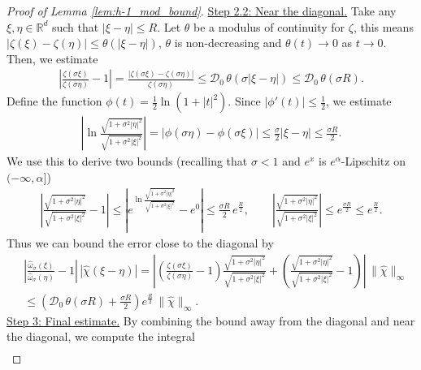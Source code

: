 \documentclass[reqno, 11pt]{amsart}
\numberwithin{equation}{section}
\theoremstyle{definition}
\begin{document}
\begin{proof}[Proof of Lemma \ref{lem:h-1_mod_bound}]
    \underline{Step 2.2: Near the diagonal.} Take any $\xi,\eta\in\mathbb{R}^{d}$ such that $|\xi-\eta|\leq R$. Let $\theta$ be a modulus of continuity for $\zeta$, this means $|\zeta(\xi)-\zeta(\eta)|\leq\theta(|\xi-\eta|)$, $\theta$ is non-decreasing and $\theta(t)\rightarrow 0$ as $t\rightarrow 0$. Then, we estimate
    \begin{align*}
        \left|\frac{\zeta(\sigma \xi)}{\zeta(\sigma \eta)}-1\right|
        =\frac{|\zeta(\sigma \xi)-\zeta(\sigma \eta)|}{\zeta(\sigma \eta)}
        \leq \mathcal{D}_0\,\theta(\sigma |\xi-\eta|)
        \leq \mathcal{D}_0\,\theta(\sigma R).
    \end{align*}
    Define the function $\phi(t)=\tfrac{1}{2}\ln(1+|t|^2)$. Since $|\phi'(t)|\le\tfrac{1}{2}$, we estimate
    \begin{align*}
        \left|\ln\frac{\sqrt{1+\sigma^2|\eta|^2}}{\sqrt{1+\sigma^2|\xi|^2}}\right|
        =|\phi(\sigma\eta)-\phi(\sigma\xi)|
        \leq \frac{\sigma}{2}|\xi-\eta|
        \leq \frac{\sigma R}{2}.
    \end{align*}
    We use this to derive two bounds (recalling that $\sigma<1$ and $e^{x}$ is $e^\alpha$-Lipschitz on $(-\infty,\alpha]$)
    \begin{align*}
        \left|\frac{\sqrt{1+\sigma^2|\eta|^2}}{\sqrt{1+\sigma^2|\xi|^2}}-1\right|
        \leq \left|e^{\ln\frac{\sqrt{1+\sigma^2|\eta|^2}}{\sqrt{1+\sigma^2|\xi|^2}}} - e^{0}
        \right|
        \leq  \frac{\sigma R}{2}\,e^{\frac{R}{2}},
        \qquad
        \left|\frac{\sqrt{1+\sigma^2|\eta|^2}}{\sqrt{1+\sigma^2|\xi|^2}}\right|
        \leq e^{\frac{\sigma R}{2}}
        \leq e^{\frac{R}{2}}.
    \end{align*}
    Thus we can bound the error close to the diagonal by
    \begin{align*}
        &\left|\frac{\hat{\omega}_\sigma(\xi)}{\hat{\omega}_\sigma(\eta)}-1\right|\,|\hat{\chi}(\xi-\eta)|
        =\left|\left(\frac{\zeta(\sigma \xi)}{\zeta(\sigma\eta)}-1\right)\frac{\sqrt{1+\sigma^2|\eta|^2}}{\sqrt{1+\sigma^2|\xi|^2}}+\left(\frac{\sqrt{1+\sigma^2|\eta|^2}}{\sqrt{1+\sigma^2|\xi|^2}}-1\right)\right|\,\|\hat{\chi}\|_\infty \\
        &\leq \left(\mathcal{D}_0\,\theta(\sigma R)+\frac{\sigma R}{2}\right)e^{\frac{R}{2}}\,\|\hat{\chi}\|_\infty .
    \end{align*}
    \underline{Step 3: Final estimate.} By combining the bound away from the diagonal and near the diagonal, we compute the integral
    \begin{align*}

\end{align*}
\end{proof}
\end{document}

